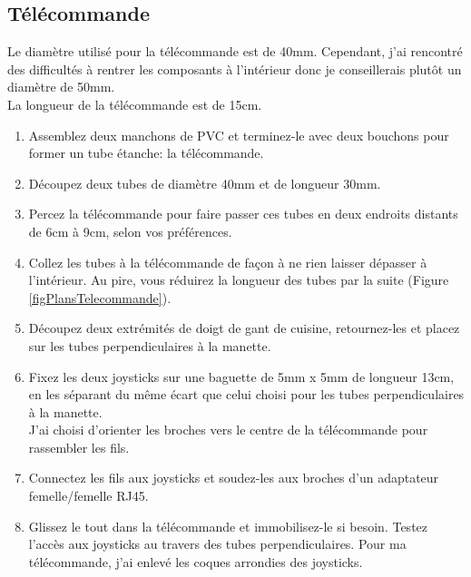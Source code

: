 \documentclass[11pt,a4paper]{article}
\begin{document}
      \subsection{Télécommande}
        Le diamètre utilisé pour la télécommande est de 40mm. Cependant, j'ai rencontré des difficultés à rentrer les composants à l'intérieur donc je conseillerais plutôt un diamètre de 50mm.\\
        La longueur de la télécommande est de 15cm.
        \begin{enumerate}
          \item Assemblez deux manchons de PVC et terminez-le avec deux bouchons pour former un tube étanche: la télécommande.
          
          \item Découpez deux tubes de diamètre 40mm et de longueur 30mm.
          
          \item Percez la télécommande pour faire passer ces tubes en deux endroits distants de 6cm à 9cm, selon vos préférences.
          
          \item Collez les tubes à la télécommande de façon à ne rien laisser dépasser à l'intérieur. Au pire, vous réduirez la longueur des tubes par la suite (Figure \ref{figPlansTelecommande}).
          
          \item Découpez deux extrémités de doigt de gant de cuisine, retournez-les et placez sur les tubes perpendiculaires à la manette.
          
          \item Fixez les deux joysticks sur une baguette de 5mm x 5mm de longueur 13cm, en les séparant du même écart que celui choisi pour les tubes perpendiculaires à la manette. \\
          J'ai choisi d'orienter les broches vers le centre de la télécommande pour rassembler les fils.
          
          \item Connectez les fils aux joysticks et soudez-les aux broches d'un adaptateur femelle/femelle RJ45.
          
          \item Glissez le tout dans la télécommande et immobilisez-le si besoin. Testez l'accès aux joysticks au travers des tubes perpendiculaires. Pour ma télécommande, j'ai enlevé les coques arrondies des joysticks.
          

\end{enumerate}
\end{document}

